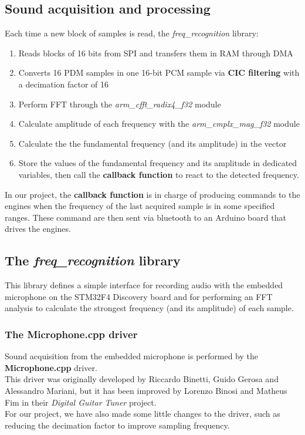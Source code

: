 \subsection{Sound acquisition and processing}
Each time a new block of samples is read, the \textit{freq\_recognition} library:
\begin{enumerate}
	\item Reads blocks of 16 bits from SPI and transfers them in RAM through DMA
	\item  Converts 16 PDM samples in one 16-bit PCM sample via \textbf{CIC filtering} with a decimation factor of 16
	\item Perform FFT through the \textit{arm\_cfft\_radix4\_f32}  module
	\item Calculate amplitude of each frequency with the \textit{arm\_cmplx\_mag\_f32} module
	\item Calculate the the fundamental frequency (and its amplitude) in the vector
	\item Store the values of the fundamental frequency and its amplitude in dedicated variables, then call the \textbf{callback function} to react to the detected frequency.
\end{enumerate}
In our project, the \textbf{callback function} is in charge of producing commands to the engines when the frequency of the last acquired sample is in some specified ranges. These command are then sent via bluetooth to an Arduino board that drives the engines.


\subsection{The \textit{freq\_recognition} library}
This library defines a simple interface for recording audio with the embedded microphone on the STM32F4 Discovery board and for performing an FFT analysis to calculate the strongest frequency (and its amplitude) of each sample.

\subsubsection{The Microphone.cpp driver}
Sound acquisition from the embedded microphone is performed by the \textbf{Microphone.cpp} driver. \\
This driver was originally developed by Riccardo Binetti, Guido Gerosa and Alessandro Mariani, but it has been improved by Lorenzo Binosi and Matheus Fim in their \textit{Digital Guitar Tuner} project. \\
For our project, we have also made some little changes to the driver, such as reducing the decimation factor to improve sampling frequency.

